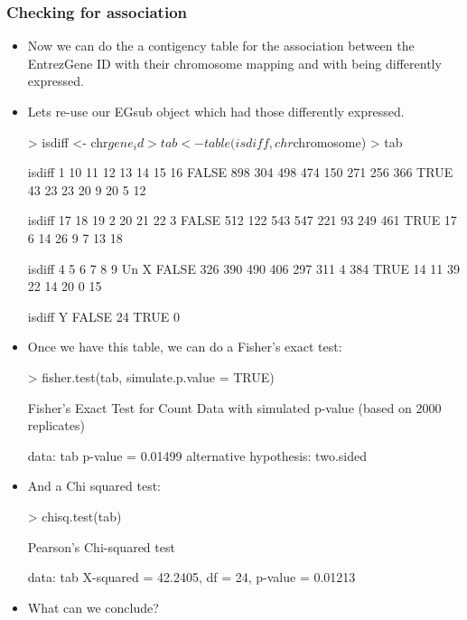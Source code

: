 \begin{frame}
  \frametitle{Checking for association}
  \begin{itemize}
  \item Now we can do the a contigency table for the association between the EntrezGene ID with their chromosome mapping \alert{and} with being differently expressed.
  \item Lets re-use our EGsub object which had those differently expressed.
\begin{Schunk}
\begin{Sinput}
> isdiff <- chr$gene_id %
> tab <- table(isdiff, chr$chromosome)
> tab
\end{Sinput}
\begin{Soutput}
isdiff    1  10  11  12  13  14  15  16
  FALSE 898 304 498 474 150 271 256 366
  TRUE   43  23  23  20   9  20   5  12
       
isdiff   17  18  19   2  20  21  22   3
  FALSE 512 122 543 547 221  93 249 461
  TRUE   17   6  14  26   9   7  13  18
       
isdiff    4   5   6   7   8   9  Un   X
  FALSE 326 390 490 406 297 311   4 384
  TRUE   14  11  39  22  14  20   0  15
       
isdiff    Y
  FALSE  24
  TRUE    0
\end{Soutput}
\end{Schunk}
  \item Once we have this table, we can do a Fisher's exact test:
\begin{Schunk}
\begin{Sinput}
> fisher.test(tab, simulate.p.value = TRUE)
\end{Sinput}
\begin{Soutput}
	Fisher's Exact Test for Count Data
	with simulated p-value (based on
	2000 replicates)

data:  tab 
p-value = 0.01499
alternative hypothesis: two.sided 
\end{Soutput}
\end{Schunk}
  \item And a Chi squared test:
\begin{Schunk}
\begin{Sinput}
> chisq.test(tab)
\end{Sinput}
\begin{Soutput}
	Pearson's Chi-squared test

data:  tab 
X-squared = 42.2405, df = 24,
p-value = 0.01213
\end{Soutput}
\end{Schunk}
  \item What can we conclude?
  \end{itemize}
\end{frame}

